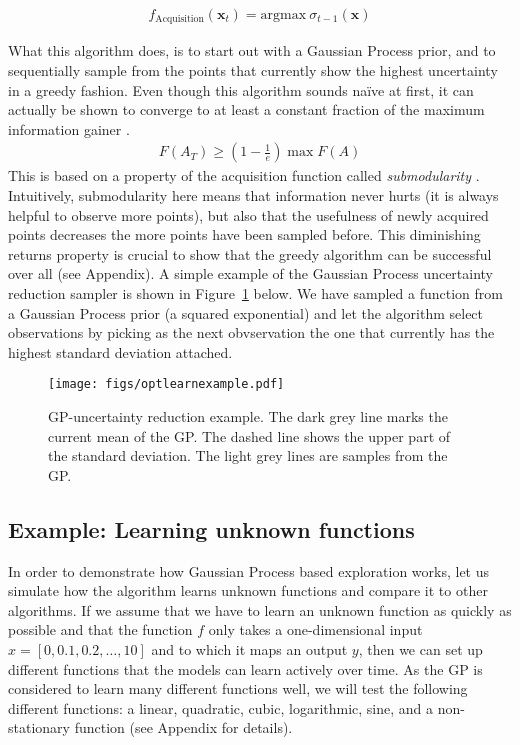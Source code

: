 \documentclass[authoryear,11pt,review]{elsarticle}
\begin{document}
\begin{align}
f_{\text{Acquisition}}(\mathbf{x}_t)= \text{argmax} ~\sigma_{t-1}(\mathbf{x})
\end{align}

What this algorithm does, is to start out with a Gaussian Process prior, and to sequentially sample from the points that currently show the highest uncertainty in a greedy fashion. Even though this algorithm sounds na\"{i}ve at first, it can actually be shown to converge to at least a constant fraction of the maximum information gainer \citep{krause2008near}.
\begin{align}
F(A_T) \geq \left(1-\frac{1}{e}\right) \max F(A)
\end{align}
This is based on a property of the acquisition function called \emph{submodularity} \citep{krause2012submodular}. Intuitively, submodularity here means that information never hurts (it is always helpful to observe more points), but also that the usefulness of newly acquired points decreases the more points have been sampled before. This diminishing returns property is crucial to show that the greedy algorithm can be successful over all (see Appendix). A simple example of the Gaussian Process uncertainty reduction sampler is shown in Figure~\ref{gpsigma} below. We have sampled a function from a Gaussian Process prior (a squared exponential) and let the algorithm select observations by picking as the next obvservation the one that currently has the highest standard deviation attached.

\begin{figure}[ht]
\caption{GP-uncertainty reduction example. The dark grey line marks the current mean of the GP. The dashed line shows the upper part of the standard deviation. The light grey lines are samples from the GP.}
\label{gpsigma}
\centering
\texttt{[image: figs/optlearnexample.pdf]}
\end{figure}


\subsection{Example: Learning unknown functions}
In order to demonstrate how Gaussian Process based exploration works, let us simulate how the algorithm learns unknown functions and compare it to other algorithms. If we assume that we have to learn an unknown function as quickly as possible and that the function $f$ only takes a one-dimensional input $x=[0,0.1,0.2,\dots,10]$ and to which it maps an output $y$, then we can set up different functions that the models can learn actively over time. As the GP is considered to learn many different functions well, we will test the following different functions: a linear, quadratic, cubic, logarithmic, sine, and a non-stationary function (see Appendix for details).  
\end{document}
